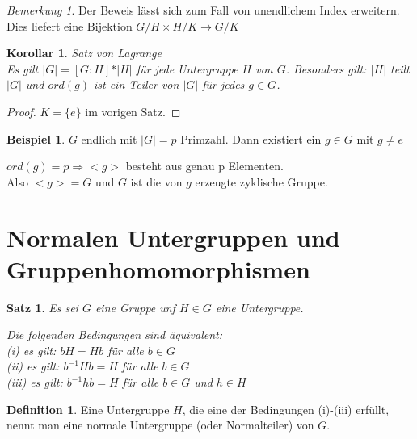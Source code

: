 \documentclass[12pt]{scrartcl}%
\newtheorem{thm}{Satz}
\newtheorem{kor}{Korollar}
\theoremstyle{definition}
\newtheorem*{defn}{Definition}
\newtheorem{ex}{Beispiel}
\theoremstyle{remark}
\newtheorem*{nb}{Bemerkung}
\begin{document}
\begin{nb}
Der Beweis lässt sich zum Fall von unendlichem Index erweitern. Dies liefert eine Bijektion $G/H \times H/K \to G/K$
\end{nb}

\begin{kor}{Satz von Lagrange}\\
Es gilt $\vert G\vert = [G:H]*\vert H\vert$ für jede Untergruppe  $H$ von $G$. Besonders gilt: $\vert H\vert$ teilt $\vert G\vert$ und $ord(g)$ ist ein Teiler von  $\vert G\vert$ für jedes $g\in G$.
\end{kor}

\begin{proof}
$K= \{ e\}$ im vorigen Satz.
\end{proof}

\begin{ex}
$G$ endlich mit $\vert G\vert=p$ Primzahl. Dann existiert ein $g \in G$ mit $g \neq e$

$ord(g)=p \Rightarrow <g>$ besteht aus genau p Elementen.\\
Also $<g>=G$ und $G$ ist die von $g$ erzeugte zyklische Gruppe.
\end{ex}

\section{Normalen Untergruppen und Gruppenhomomorphismen}

\begin{thm}
Es sei $G$ eine Gruppe unf $H\in G$ eine Untergruppe.

Die folgenden Bedingungen sind äquivalent:\\
(i) es gilt: $bH=Hb$ für alle $b\in G$\\
(ii) es gilt: $b^{-1}Hb=H$ für alle $b\in G$\\
(iii) es gilt: $b^{-1}hb=H$ für alle $b\in G$ und $h\in H$
\end{thm}

\begin{defn}
Eine Untergruppe $H$, die eine der Bedingungen (i)-(iii) erfüllt, nennt man eine normale Untergruppe (oder Normalteiler) von $G$.
\end{defn}
\end{document}
